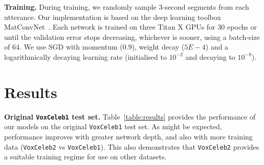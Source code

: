 \documentclass[a4paper]{article}
\def\newpara{\vspace{2pt}}
\begin{document}
\newpara\noindent\textbf{Training.}
During training, we randomly sample 3-second segments from each utterance.
Our implementation is based on the deep learning toolbox MatConvNet~\cite{Vedaldi14a}.
Each network is trained on three Titan X GPUs for $30$ epochs or until the validation error stops decreasing, whichever is sooner, using a batch-size of $64$. We use SGD with momentum ($0.9$), weight decay ($5E-4$) and a logarithmically decaying learning rate (initialised to $10^{-2}$ and decaying to $10^{-8}$). 



\section{Results}
\label{sec:results}
\newpara\noindent\textbf{Original \texttt{VoxCeleb1}  test set.}
Table~\ref{table:results} provides the performance of our models on
the original \texttt{VoxCeleb1} test set. As might be expected, performance improves with greater network depth, and
also with more training data (\texttt{VoxCeleb2} vs \texttt{VoxCeleb1}). This also demonstrates that 
\texttt{VoxCeleb2} provides a suitable training regime for use on other datasets.
\end{document}
